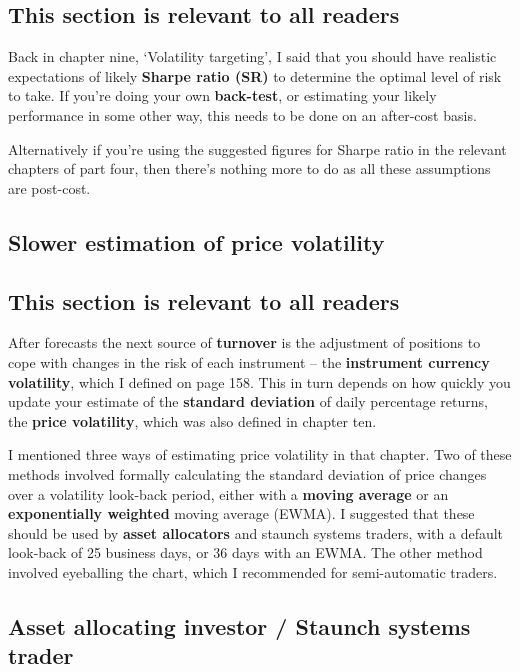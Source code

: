 \subsection*{This section is relevant to all readers}

Back in chapter nine, ‘Volatility targeting', I said that you should have realistic expectations of likely \textbf{Sharpe ratio (SR)} to determine the optimal level of risk to take. If you're doing your own \textbf{back-test}, or estimating your likely performance in some other way, this needs to be done on an after-cost basis.

Alternatively if you're using the suggested figures for Sharpe ratio in the relevant chapters of part four, then there's nothing more to do as all these assumptions are post-cost.

\subsection*{Slower estimation of price volatility}

\subsection*{This section is relevant to all readers}

After forecasts the next source of \textbf{turnover} is the adjustment of positions to cope with changes in the risk of each instrument -- the \textbf{instrument currency volatility}, which I defined on page 158. This in turn depends on how quickly you update your estimate of the \textbf{standard deviation} of daily percentage returns, the \textbf{price volatility}, which was also defined in chapter ten.

I mentioned three ways of estimating price volatility in that chapter. Two of these methods involved formally calculating the standard deviation of price changes over a volatility look-back period, either with a \textbf{moving average} or an \textbf{exponentially weighted} moving average (EWMA). I suggested that these should be used by \textbf{asset allocators} and staunch systems traders, with a default look-back of 25 business days, or 36 days with an EWMA. The other method involved eyeballing the chart, which I recommended for semi-automatic traders.

\subsection*{Asset allocating investor / Staunch systems trader}

